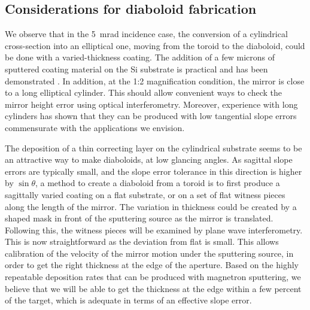 \documentclass[preprint]{iucr}       %
\newcommand{\inred}[1]{{\color{red}#1}}
\begin{document}
\subsection{Considerations for diaboloid fabrication}
We observe that in the \SI{5}{\milli\radian} incidence case, the conversion of a cylindrical cross-section into an elliptical one, moving from the toroid to the diaboloid, could be done with a varied-thickness coating. The addition of a few microns of sputtered coating material
on the Si substrate is practical and has been demonstrated \cite{Morawe}. In addition, at the 1:2 magnification condition, the mirror is close to a long elliptical cylinder. This should allow convenient ways to check the mirror height error using optical interferometry. Moreover, experience with long cylinders has shown that they can be produced with low tangential slope errors commensurate with the applications we envision. 

The deposition of a thin correcting layer
\inred{on the} cylindrical substrate seems to be an attractive way to make diaboloids, at low glancing angles. %
As sagittal slope errors are typically small, and the slope error tolerance in this direction is higher by $\sin\theta$, a method to create a diaboloid from a toroid is to first produce a sagittally varied coating on a flat substrate, or on a set of flat witness pieces along the length of the mirror. The variation in thickness could be created by a shaped mask in front of the sputtering source as the mirror is translated. Following this, the witness pieces will be examined by plane wave interferometry. This is now straightforward as the deviation from flat is small.
This allows calibration of the velocity of the mirror motion under the sputtering source, in order to get the right thickness at the edge of the aperture. Based on the highly repeatable deposition rates that can be produced with magnetron sputtering, we believe that we will be able to get the thickness at the edge within a few percent of the target, which is adequate in terms of an effective slope error. 
\end{document}
